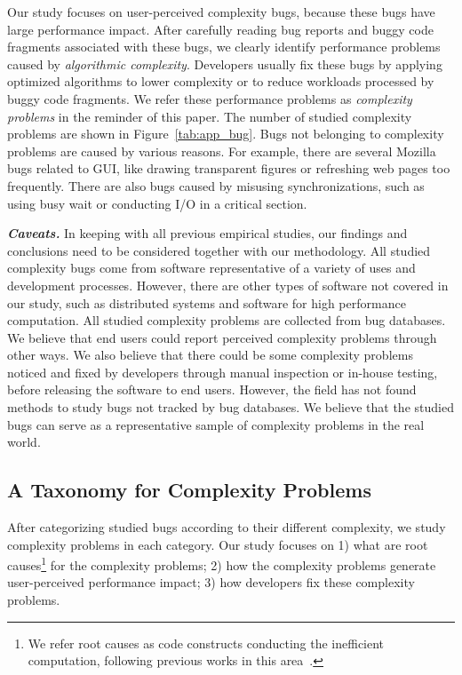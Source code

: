 Our study focuses on user-perceived complexity bugs, 
because these bugs have large performance impact.
After carefully reading bug reports and buggy code fragments 
associated with these bugs,
we clearly identify \ComBugs performance problems 
caused by {\textit{algorithmic complexity}}.
Developers usually fix these bugs by applying optimized algorithms to lower complexity
or to reduce workloads processed by buggy code fragments. 
We refer these performance problems as 
{\textit{complexity problems}} in the reminder of this paper.
The number of studied complexity problems are shown in Figure~\ref{tab:app_bug}.
Bugs not belonging to complexity problems are caused by various reasons.
For example, there are several Mozilla bugs related to GUI, 
like drawing transparent figures or refreshing web pages too frequently. 
There are also bugs caused by misusing synchronizations, 
such as using busy wait or conducting I/O in a critical section. 

{\bf{\textit{Caveats.}}}
In keeping with all previous empirical studies, 
our findings and conclusions need to be considered together with our methodology.
All studied complexity bugs come from software representative of a variety of uses and development processes. 
However, there are other types of software not covered in our study, 
such as distributed systems and software for high performance computation. 
All studied complexity problems are collected from bug databases.  
We believe that end users could report perceived complexity problems through other ways.
We also believe that there could be some complexity problems noticed 
and fixed by developers through manual inspection or in-house testing, 
before releasing the software to end users.  
However, the field has not found methods to study bugs not tracked by bug databases.
We believe that the studied bugs can serve as a representative sample
of complexity problems in the real world. 



\subsection{A Taxonomy for Complexity Problems}
\label{sec:tax}



After categorizing studied bugs according to their different complexity, 
we study complexity problems in each category.
Our study focuses on 
1) what are root causes\footnote{We refer root causes as code constructs 
conducting the inefficient computation, 
following previous works in this area~\cite{SongOOPSLA2014,ldoctor}.} 
for the complexity problems;
2) how the complexity problems generate user-perceived performance impact;
3) how developers fix these complexity problems. 

